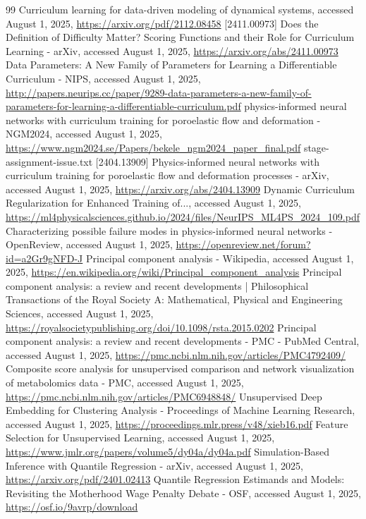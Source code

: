 \documentclass[11pt, letterpaper]{article}
\begin{document}
\newpage
\begin{thebibliography}{99}
     Curriculum learning for data-driven modeling of dynamical systems, accessed August 1, 2025, \url{https://arxiv.org/pdf/2112.08458}
     [2411.00973] Does the Definition of Difficulty Matter? Scoring Functions and their Role for Curriculum Learning - arXiv, accessed August 1, 2025, \url{https://arxiv.org/abs/2411.00973}
     Data Parameters: A New Family of Parameters for Learning a Differentiable Curriculum - NIPS, accessed August 1, 2025, \url{http://papers.neurips.cc/paper/9289-data-parameters-a-new-family-of-parameters-for-learning-a-differentiable-curriculum.pdf}
     physics-informed neural networks with curriculum training for poroelastic flow and deformation - NGM2024, accessed August 1, 2025, \url{https://www.ngm2024.se/Papers/bekele_ngm2024_paper_final.pdf}
     stage-assignment-issue.txt
     [2404.13909] Physics-informed neural networks with curriculum training for poroelastic flow and deformation processes - arXiv, accessed August 1, 2025, \url{https://arxiv.org/abs/2404.13909}
     Dynamic Curriculum Regularization for Enhanced Training of..., accessed August 1, 2025, \url{https://ml4physicalsciences.github.io/2024/files/NeurIPS_ML4PS_2024_109.pdf}
     Characterizing possible failure modes in physics-informed neural networks - OpenReview, accessed August 1, 2025, \url{https://openreview.net/forum?id=a2Gr9gNFD-J}
     Principal component analysis - Wikipedia, accessed August 1, 2025, \url{https://en.wikipedia.org/wiki/Principal_component_analysis}
     Principal component analysis: a review and recent developments | Philosophical Transactions of the Royal Society A: Mathematical, Physical and Engineering Sciences, accessed August 1, 2025, \url{https://royalsocietypublishing.org/doi/10.1098/rsta.2015.0202}
     Principal component analysis: a review and recent developments - PMC - PubMed Central, accessed August 1, 2025, \url{https://pmc.ncbi.nlm.nih.gov/articles/PMC4792409/}
     Composite score analysis for unsupervised comparison and network visualization of metabolomics data - PMC, accessed August 1, 2025, \url{https://pmc.ncbi.nlm.nih.gov/articles/PMC6948848/}
     Unsupervised Deep Embedding for Clustering Analysis - Proceedings of Machine Learning Research, accessed August 1, 2025, \url{https://proceedings.mlr.press/v48/xieb16.pdf}
     Feature Selection for Unsupervised Learning, accessed August 1, 2025, \url{https://www.jmlr.org/papers/volume5/dy04a/dy04a.pdf}
     Simulation-Based Inference with Quantile Regression - arXiv, accessed August 1, 2025, \url{https://arxiv.org/pdf/2401.02413}
     Quantile Regression Estimands and Models: Revisiting the Motherhood Wage Penalty Debate - OSF, accessed August 1, 2025, \url{https://osf.io/9avrp/download}
\end{thebibliography}
\end{document}
